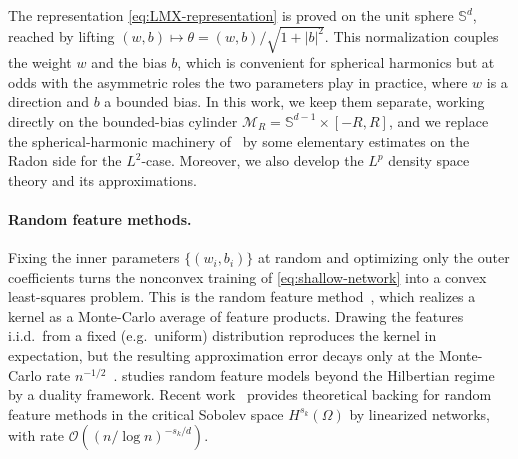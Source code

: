\documentclass[12pt]{article}
\numberwithin{equation}{section}
\numberwithin{figure}{section}
\numberwithin{equation}{section}
\newcommand{\Sph}{\mathbb S}
\newcommand{\MR}{\mathcal M_R}
\newcommand{\abs}[1]{\left|#1\right|}
\begin{document}
The representation \eqref{eq:LMX-representation} is proved on the unit sphere
$\Sph^{d}$, reached by lifting $(w,b)\mapsto\theta=(w,b)/\sqrt{1+\abs{b}^2}$. This
normalization couples the weight $w$ and the bias $b$, which is convenient for
spherical harmonics but at odds with the asymmetric roles the two parameters play
in practice, where $w$ is a direction and $b$ a bounded bias. In this work, we keep them separate, working directly on the bounded-bias cylinder
$\MR=\Sph^{d-1}\times[-R,R]$, and we replace the spherical-harmonic machinery
of~\cite{liu_integralrepresentationssobolev_2025} by some elementary estimates on
the Radon side for the $L^2$-case. Moreover, we also develop the $L^p$ density
space theory and its approximations.

\paragraph{Random feature methods.}
Fixing the inner parameters $\{(w_i,b_i)\}$ at random and optimizing only the outer coefficients turns the nonconvex training of \eqref{eq:shallow-network}
into a convex least-squares problem. This is the random feature
method~\cite{rahimi_randomfeatureslargescale_2007,rahimi_WeightedSumsRandom_2008},
which realizes a kernel as a Monte-Carlo average of feature products. Drawing the
features i.i.d.\ from a fixed (e.g.\ uniform) distribution reproduces the kernel
in expectation, but the resulting approximation error decays only at the
Monte-Carlo rate $n^{-1/2}$~\cite{rahimi_WeightedSumsRandom_2008,%
rudi_GeneralizationPropertiesLearning_2017}. 
\cite{chen_dualityframeworkanalyzing_2025} studies random feature models beyond the Hilbertian regime by a duality framework. 
Recent work~\cite[Theorem 6.2]{liu_integralrepresentationssobolev_2025} provides theoretical
backing for random feature methods in the critical Sobolev space $H^{s_k}(\Omega)$ 
by linearized networks, with rate $\mathcal{O}\left( (n/\log n)^{-s_k/d}\right)$.
\end{document}
